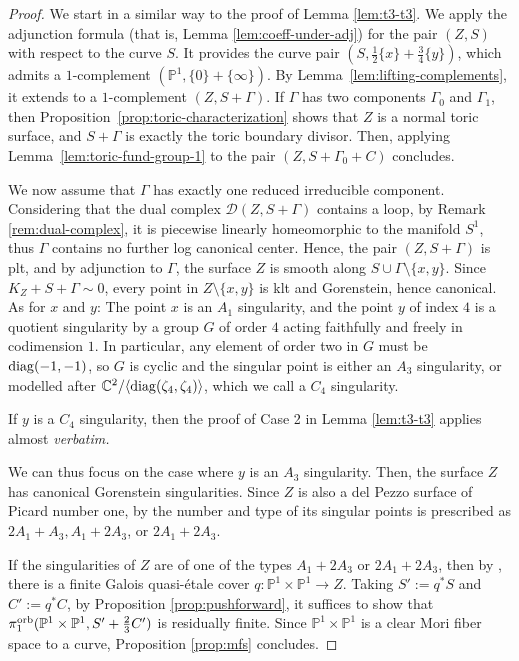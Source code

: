 \documentclass{amsart}
\newcommand{\pp}{\mathbb{P}}
\theoremstyle{definition}
\theoremstyle{remark}
\numberwithin{equation}{section}
\begin{document}
\begin{proof}
We start in a similar way to the proof of Lemma \ref{lem:t3-t3}. We apply the adjunction formula (that is, Lemma \ref{lem:coeff-under-adj}) for the pair $(Z,S)$ with respect to the curve $S$. It  provides the curve pair $(S,\frac{1}{2}\{x\}+\frac{3}{4}\{y\})$, which admits a $1$-complement $(\pp^1,\{0\}+\{\infty\})$. By Lemma~\ref{lem:lifting-complements}, it extends to a $1$-complement $(Z,S+\Gamma)$. 
If $\Gamma$ has two components $\Gamma_0$ and $\Gamma_1$, then Proposition~\ref{prop:toric-characterization} shows that $Z$ is a normal toric surface, and $S+\Gamma$ is exactly the toric boundary divisor. Then, applying Lemma~\ref{lem:toric-fund-group-1} to the pair $(Z,S+\Gamma_0+C)$ concludes.

We now assume that $\Gamma$ has exactly one reduced irreducible component. Considering that the dual complex $\mathcal{D}(Z,S+\Gamma)$ contains a loop, by Remark \ref{rem:dual-complex}, it is piecewise linearly homeomorphic to the manifold $S^1$, thus $\Gamma$ contains no further log canonical center. Hence, the pair $(Z,S+\Gamma)$ is plt, and by adjunction to $\Gamma$, the surface $Z$ is smooth along $S\cup \Gamma \setminus\{x,y\}$. Since $K_Z+S+\Gamma\sim 0$, every point in $Z\setminus \{x,y\}$ is klt and Gorenstein, hence canonical. As for $x$ and $y$: The point $x$ is an $A_1$ singularity, and the point $y$ of index $4$ is a quotient singularity by a group $G$ of order $4$ acting faithfully and freely in codimension $1$. In particular, any element of order two in $G$ must be ${\rm diag}(-1,-1)$, so $G$ is cyclic and the singular point is either an $A_3$ singularity, or modelled after $\mathbb{C}^2/\langle{\rm diag}(\zeta_4,\zeta_4)\rangle$, which we call a $C_4$ singularity.

\medskip

If $y$ is a $C_4$ singularity, then the proof of Case 2 in Lemma \ref{lem:t3-t3} applies almost {\it verbatim.}

\medskip

We can thus focus on the case where $y$ is an $A_3$ singularity. Then, the surface $Z$ has canonical Gorenstein singularities. Since $Z$ is also a del Pezzo surface of Picard number one, by \cite[Lemma 3]{MZ88} the number and type of its singular points is prescribed as $2A_1+A_3, A_1+2A_3$, or $2A_1+2A_3$. 

If the singularities of $Z$ are of one of the types $A_1+2A_3$ or $2A_1+2A_3$, then by \cite[Lemma 6, Table I]{MZ88}, there is a finite Galois quasi-\'etale cover $q:\pp^1\times \pp^1\to Z$. Taking $S':=q^*S$ and $C':=q^*C$, by Proposition \ref{prop:pushforward}, it suffices to show that $\pi_1^{\rm orb}(\pp^1\times\pp^1,S'+\frac{2}{3}C')$ is residually finite. Since $\pp^1\times\pp^1$ is a clear Mori fiber space to a curve, Proposition \ref{prop:mfs} concludes.


\end{proof}
\end{document}
